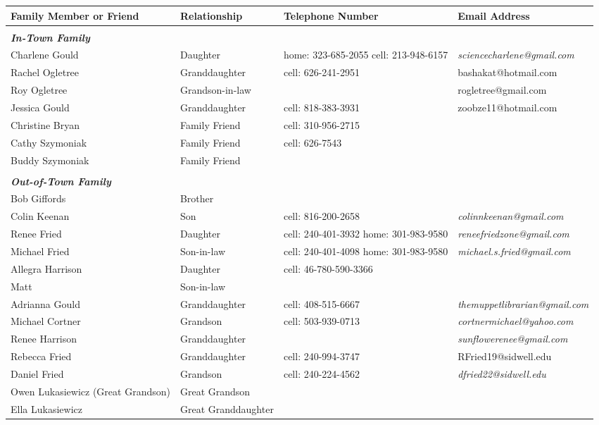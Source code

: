 \documentclass[]{article}
\newcommand{\sw}{.15\textwidth}
\begin{document}
\begin{tabular}{|p{\sw}|p{\sw}|p{\sw}|p{\sw}|}
\hline
Family Member or Friend & Relationship & Telephone Number & Email Address\\ \hline
& & &\\ \hline
\textbf{\emph{In-Town Family}} & & &\\ \hline
Charlene Gould & Daughter & home: 323-685-2055 cell: 213-948-6157 & \emph{sciencecharlene@gmail.com}\\ \hline
Rachel Ogletree & Granddaughter & cell: 626-241-2951 & bashakat@hotmail.com\\ \hline
Roy Ogletree & Grandson-in-law & & rogletree@gmail.com\\ \hline
Jessica Gould & Granddaughter & cell: 818-383-3931 & zoobze11@hotmail.com\\ \hline
Christine Bryan & Family Friend & cell: 310-956-2715 &\\ \hline
Cathy Szymoniak & Family Friend & cell: 626-7543 &\\ \hline
Buddy Szymoniak & Family Friend & &\\ \hline
& & &\\ \hline
\textbf{\emph{Out-of-Town Family}} & & &\\ \hline
Bob Giffords & Brother & &\\ \hline
Colin Keenan & Son & cell: 816-200-2658 & \emph{colinnkeenan@gmail.com}\\ \hline
Renee Fried & Daughter & cell: 240-401-3932 home: 301-983-9580 & \emph{reneefriedzone@gmail.com}\\ \hline
Michael Fried & Son-in-law & cell: 240-401-4098 home: 301-983-9580 & \emph{michael.s.fried@gmail.com}\\ \hline
Allegra Harrison & Daughter & cell: 46-780-590-3366 &\\ \hline
Matt & Son-in-law & &\\ \hline
Adrianna Gould & Granddaughter & cell: 408-515-6667 & \emph{themuppetlibrarian@gmail.com}\\ \hline
Michael Cortner & Grandson & cell: 503-939-0713 & \emph{cortnermichael@yahoo.com}\\ \hline
Renee Harrison & Granddaughter & & \emph{sunflowerenee@gmail.com}\\ \hline
Rebecca Fried & Granddaughter & cell: 240-994-3747 & RFried19@sidwell.edu\\ \hline
Daniel Fried & Grandson & cell: 240-224-4562 & \emph{dfried22@sidwell.edu}\\ \hline
Owen Lukasiewicz (Great Grandson) & Great Grandson & &\\ \hline 
Ella Lukasiewicz & Great Granddaughter & &\\ 
\hline
\end{tabular}
\end{document}
